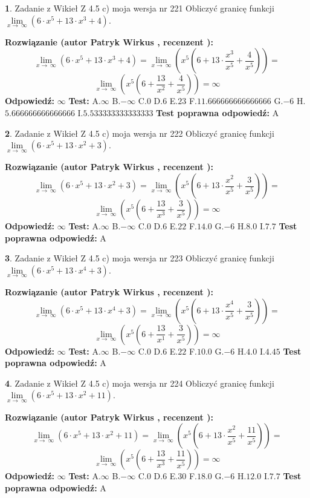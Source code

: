 \documentclass[12pt, a4paper]{article}
\theoremstyle{definition} %
\newtheorem{zad}{}
\newcommand{\zadStart}[1]{\begin{zad}#1\newline}
\newcommand{\zadStop}{\end{zad}}
\newcommand{\rozwStart}[2]{\noindent \textbf{Rozwiązanie (autor #1 , recenzent #2): }\newline}
\newcommand{\rozwStop}{\newline}
\newcommand{\odpStart}{\noindent \textbf{Odpowiedź:}\newline}
\newcommand{\odpStop}{\newline}
\newcommand{\testStart}{\noindent \textbf{Test:}\newline}
\newcommand{\testStop}{\newline}
\newcommand{\kluczStart}{\noindent \textbf{Test poprawna odpowiedź:}\newline}
\newcommand{\kluczStop}{\newline}
\begin{document}
\zadStart{Zadanie z Wikieł Z 4.5 c) moja wersja nr 221}
Obliczyć granicę funkcji  $\lim\limits_{x\to\ \infty}(6 \cdot x^{5}+13 \cdot x^{3}+4)$.
\zadStop
\rozwStart{Patryk Wirkus}{}
$$\lim\limits_{x\to\ \infty}(6 \cdot x^{5}+13 \cdot x^{3}+4) = \lim\limits_{x\to\ \infty}(x^{5}(6 +13 \cdot \frac{x^{3}}{x^{5}}+\frac{4}{x^{5}})) =$$ $$\lim\limits_{x\to\ \infty}(x^{5}(6 +\frac{13}{x^{2}}+\frac{4}{x^{5}})) =\infty$$
\rozwStop
\odpStart
$\infty$
\odpStop
\testStart
A.$\infty$ B.$-\infty$ C.$0$ D.$6$ E.$23$
F.$11.666666666666666$ G.$-6$
H.$5.666666666666666$
I.$5.533333333333333$
\testStop
\kluczStart
A
\kluczStop



\zadStart{Zadanie z Wikieł Z 4.5 c) moja wersja nr 222}
Obliczyć granicę funkcji  $\lim\limits_{x\to\ \infty}(6 \cdot x^{5}+13 \cdot x^{2}+3)$.
\zadStop
\rozwStart{Patryk Wirkus}{}
$$\lim\limits_{x\to\ \infty}(6 \cdot x^{5}+13 \cdot x^{2}+3) = \lim\limits_{x\to\ \infty}(x^{5}(6 +13 \cdot \frac{x^{2}}{x^{5}}+\frac{3}{x^{5}})) =$$ $$\lim\limits_{x\to\ \infty}(x^{5}(6 +\frac{13}{x^{3}}+\frac{3}{x^{5}})) =\infty$$
\rozwStop
\odpStart
$\infty$
\odpStop
\testStart
A.$\infty$ B.$-\infty$ C.$0$ D.$6$ E.$22$
F.$14.0$ G.$-6$
H.$8.0$
I.$7.7$
\testStop
\kluczStart
A
\kluczStop



\zadStart{Zadanie z Wikieł Z 4.5 c) moja wersja nr 223}
Obliczyć granicę funkcji  $\lim\limits_{x\to\ \infty}(6 \cdot x^{5}+13 \cdot x^{4}+3)$.
\zadStop
\rozwStart{Patryk Wirkus}{}
$$\lim\limits_{x\to\ \infty}(6 \cdot x^{5}+13 \cdot x^{4}+3) = \lim\limits_{x\to\ \infty}(x^{5}(6 +13 \cdot \frac{x^{4}}{x^{5}}+\frac{3}{x^{5}})) =$$ $$\lim\limits_{x\to\ \infty}(x^{5}(6 +\frac{13}{x^{1}}+\frac{3}{x^{5}})) =\infty$$
\rozwStop
\odpStart
$\infty$
\odpStop
\testStart
A.$\infty$ B.$-\infty$ C.$0$ D.$6$ E.$22$
F.$10.0$ G.$-6$
H.$4.0$
I.$4.45$
\testStop
\kluczStart
A
\kluczStop



\zadStart{Zadanie z Wikieł Z 4.5 c) moja wersja nr 224}
Obliczyć granicę funkcji  $\lim\limits_{x\to\ \infty}(6 \cdot x^{5}+13 \cdot x^{2}+11)$.
\zadStop
\rozwStart{Patryk Wirkus}{}
$$\lim\limits_{x\to\ \infty}(6 \cdot x^{5}+13 \cdot x^{2}+11) = \lim\limits_{x\to\ \infty}(x^{5}(6 +13 \cdot \frac{x^{2}}{x^{5}}+\frac{11}{x^{5}})) =$$ $$\lim\limits_{x\to\ \infty}(x^{5}(6 +\frac{13}{x^{3}}+\frac{11}{x^{5}})) =\infty$$
\rozwStop
\odpStart
$\infty$
\odpStop
\testStart
A.$\infty$ B.$-\infty$ C.$0$ D.$6$ E.$30$
F.$18.0$ G.$-6$
H.$12.0$
I.$7.7$
\testStop
\kluczStart
A
\kluczStop
\end{document}
